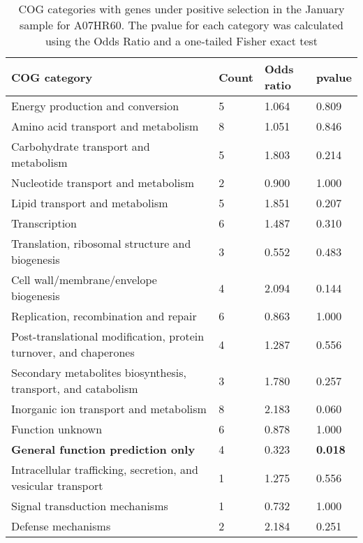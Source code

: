 \begin{table}[]
\footnotesize 
	\tabcolsep=0.11cm 
\caption{COG categories with genes under positive selection in the January sample for A07HR60. The pvalue for each category was calculated using the Odds Ratio and a one-tailed Fisher exact test \\} 
\begin{tabularx}{\textwidth}{L{6cm}R{2cm}R{2cm}R{2cm}} 
\hline 
\textbf{COG category} & \textbf{Count} & \textbf{Odds ratio} & \textbf{pvalue} \\ 
\hline 
Energy production and conversion & 5 & 1.064 & 0.809 \\ 
Amino acid transport and metabolism & 8 & 1.051 & 0.846 \\ 
Carbohydrate transport and metabolism & 5 & 1.803 & 0.214 \\ 
Nucleotide transport and metabolism & 2 & 0.900 & 1.000 \\ 
Lipid transport and metabolism & 5 & 1.851 & 0.207 \\ 
Transcription & 6 & 1.487 & 0.310 \\ 
Translation, ribosomal structure and biogenesis & 3 & 0.552 & 0.483 \\ 
Cell wall/membrane/envelope biogenesis & 4 & 2.094 & 0.144 \\ 
Replication, recombination and repair & 6 & 0.863 & 1.000 \\ 
Post-translational modification, protein turnover, and chaperones & 4 & 1.287 & 0.556 \\ 
Secondary metabolites biosynthesis, transport, and catabolism & 3 & 1.780 & 0.257 \\ 
Inorganic ion transport and metabolism & 8 & 2.183 & 0.060 \\ 
Function unknown & 6 & 0.878 & 1.000 \\ 
\textbf{General function prediction only} & 4 & 0.323 & \textbf{0.018} \\ 
Intracellular trafficking, secretion, and vesicular transport & 1 & 1.275 & 0.556 \\ 
Signal transduction mechanisms & 1 & 0.732 & 1.000 \\ 
Defense mechanisms & 2 & 2.184 & 0.251 \\ 
\end{tabularx} 
\label{January_COG_Selection_A07HR60} 
 \end{table} 

